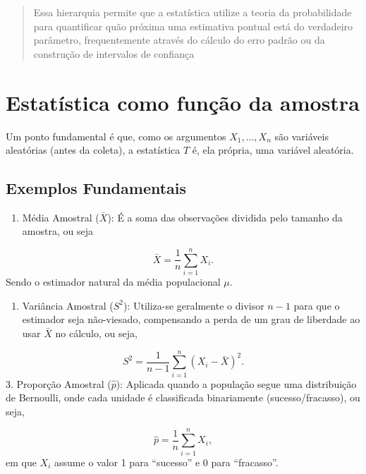 \documentclass[
  letterpaper,
  DIV=11,
  numbers=noendperiod]{scrreprt}
\providecommand{\tightlist}{%
  \setlength{\itemsep}{0pt}\setlength{\parskip}{0pt}}\usepackage{longtable,booktabs,array}
\begin{document}
\begin{quote}
Essa hierarquia permite que a estatística utilize a teoria da
probabilidade para quantificar quão próxima uma estimativa pontual está
do verdadeiro parâmetro, frequentemente através do cálculo do erro
padrão ou da construção de intervalos de confiança
\end{quote}

\section{Estatística como função da
amostra}\label{estatuxedstica-como-funuxe7uxe3o-da-amostra}

Um ponto fundamental é que, como os argumentos \(X_1, \dots, X_n\) são
variáveis aleatórias (antes da coleta), a estatística \(T\) é, ela
própria, uma variável aleatória.

\subsection*{Exemplos Fundamentais}\label{exemplos-fundamentais}

\begin{enumerate}
\def\labelenumi{\arabic{enumi}.}
\tightlist
\item
  Média Amostral (\(\bar{X}\)): É a soma das observações dividida pelo
  tamanho da amostra, ou seja
\end{enumerate}

\[\bar{X} = \frac{1}{n}\sum\limits_{i=1}^{n} X_i.\] Sendo o estimador
natural da média populacional \(\mu\).

\begin{enumerate}
\def\labelenumi{\arabic{enumi}.}
\setcounter{enumi}{1}
\tightlist
\item
  Variância Amostral (\(S^2\)): Utiliza-se geralmente o divisor \(n-1\)
  para que o estimador seja não-viesado, compensando a perda de um grau
  de liberdade ao usar \(\bar{X}\) no cálculo, ou seja,
\end{enumerate}

\[S^2 = \frac{1}{n-1}\sum\limits_{i=1}^{n}(X_i - \bar X)^2.\] 3.
Proporção Amostral (\(\hat p\)): Aplicada quando a população segue uma
distribuição de Bernoulli, onde cada unidade é classificada binariamente
(sucesso/fracasso), ou seja,

\[\hat p = \frac{1}{n}\sum\limits_{i=1}^{n} X_i,\] em que \(X_i\) assume
o valor 1 para ``sucesso'' e 0 para ``fracasso''.
\end{document}
